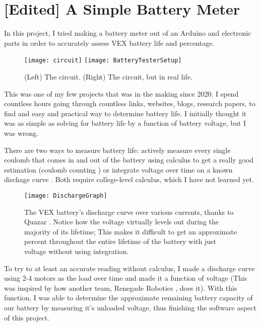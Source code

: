 \section{[Edited] A Simple Battery Meter}
In this project, I tried making a battery meter out of an Arduino and electronic parts in order to accurately assess VEX battery life and percentage.

\begin{figure}[h]
    \centering
    \texttt{[image: circuit]}
    \texttt{[image: BatteryTesterSetup]}
    \caption{
        (Left) The circuit. (Right) The circuit, but in real life.
    }
\end{figure}

This was one of my few projects that was in the making since 2020. I spend countless hours going through countless links, websites, blogs, research papers, to find and easy and practical way to determine battery life. I initially thought it was as simple as solving for battery life by a function of battery voltage, but I was wrong.

There are two ways to measure battery life: actively measure every single coulomb that comes in and out of the battery using calculus to get a really good estimation (coulomb counting \cite{CoulombCounting}) or integrate voltage over time on a known dischage curve \cite{IntegrationVoltage}. Both require college-level calculus, which I have not learned yet.

\begin{figure}[h]
    \centering
    \texttt{[image: DischargeGraph]}
    \caption{
        The VEX battery's discharge curve over various currents, thanks to Quazar \cite{Quazar}. Notice how the voltage virtually levels out during the majority of its lifetime; This makes it difficult to get an approximate percent throughout the entire lifetime of the battery with just voltage without using integration.
    }
\end{figure}

To try to at least an accurate reading without calculus, I made a discharge curve using 2-4 motors as the load over time and made it a function of voltage (This was inspired by how another team, Renegade Robotics \cite{RenegadeRobotics}, does it). With this function, I was able to determine the approximate remaining battery capacity of our battery by measuring it's unloaded voltage, thus finishing the software aspect of this project.

